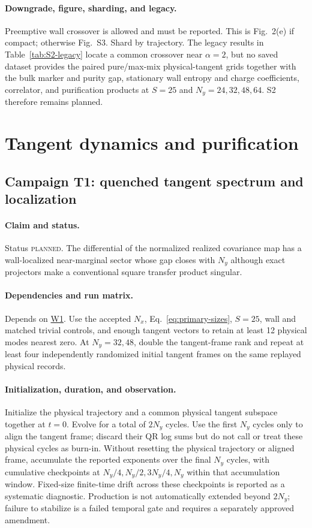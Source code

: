 \documentclass[aps,prx,twocolumn,floatfix,nofootinbib,superscriptaddress,longbibliography]{revtex4-2}
\newcommand{\planned}{\textsc{planned}}
\newcommand{\campref}[1]{\hyperref[camp:#1]{#1}}
\begin{document}
\paragraph*{Downgrade, figure, sharding, and legacy.}
Preemptive wall crossover is allowed and must be reported.  This is Fig.~2(e) if compact;
otherwise Fig.~S3.  Shard by trajectory.  The legacy results in
Table~\ref{tab:S2-legacy} locate a common crossover near $\alpha=2$, but no saved dataset
provides the paired pure/max-mix physical-tangent grids together with the bulk marker and
purity gap, stationary wall entropy and charge coefficients, correlator, and purification
products at $S=25$ and $N_y=24,32,48,64$.
S2 therefore remains planned.

\section{Tangent dynamics and purification}

\subsection{Campaign T1: quenched tangent spectrum and localization}
\label{camp:T1}
\paragraph*{Claim and status.}
Status \planned.  The differential of the normalized realized covariance map has a
wall-localized near-marginal sector whose gap closes with $N_y$ although exact projectors
make a conventional square transfer product singular.

\paragraph*{Dependencies and run matrix.}
Depends on \campref{W1}.  Use the accepted $N_x$, Eq.~\eqref{eq:primary-sizes},
$S=25$, wall and matched trivial controls, and enough tangent vectors to retain at least 12
physical modes nearest zero.  At $N_y=32,48$, double the tangent-frame rank and repeat at
least four independently randomized initial tangent frames on the same replayed physical
records.

\paragraph*{Initialization, duration, and observation.}
Initialize the physical trajectory and a common physical tangent subspace together at
$t=0$.  Evolve for a total of $2N_y$ cycles.  Use the first $N_y$ cycles only to align the
tangent frame; discard their QR log sums but do not call or treat these physical cycles as
burn-in.  Without resetting the physical trajectory or aligned frame, accumulate the
reported exponents over the final $N_y$ cycles, with cumulative checkpoints at
$N_y/4,N_y/2,3N_y/4,N_y$ within that accumulation window.  Fixed-size finite-time drift
across these checkpoints is reported as a systematic diagnostic.  Production is not
automatically extended beyond $2N_y$; failure to stabilize is a failed temporal gate and
requires a separately approved amendment.
\end{document}
